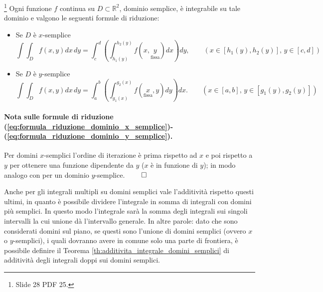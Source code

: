 \begin{theorem}\label{th:formula_riduzione_domini_semplici}\footnote{Slide 28 PDF 25.}
	Ogni funzione $f$ continua su $D\subset\mathbb{R}^2$, dominio semplice, è integrabile su tale dominio e valgono le seguenti formule di riduzione:
	\begin{itemize}
		\item Se $D$ è $x$-semplice
		\begin{equation}\label{eq:formula_riduzione_dominio_x_semplice}
			\int\int_D f(x,y) dx \, dy = \int_c^d\left(\int_{h_1(y)}^{h_2(y)}f(x,\underset{\text{fissa}}{y}) dx\right)dy,\qquad (x\in[h_1(y), h_2(y)],\, y\in [c,d])
		\end{equation}
		\item Se $D$ è $y$-semplice
		\begin{equation}\label{eq:formula_riduzione_dominio_y_semplice}
			\int\int_D f(x,y)dx\, dy = \int_a^b\left(\int_{g_1(x)}^{g_2(x)}f(\underset{\text{fissa}}{x},y)dy\right)dx. \qquad (x\in[a,b],\, y\in [g_1(y), g_2(y)])
		\end{equation}
	\end{itemize}
\end{theorem}

\paragraph{Nota sulle formule di riduzione (\ref{eq:formula_riduzione_dominio_x_semplice})-(\ref{eq:formula_riduzione_dominio_y_semplice}).} Per domini $x$-semplici l'ordine di iterazione è prima rispetto ad $x$ e poi rispetto a $y$ per ottenere una funzione dipendente da $y$ ($x$ è in funzione di $y$); in modo analogo con per un dominio $y$-semplice. $\qed$

Anche per gli integrali multipli su domini semplici vale l'additività rispetto questi ultimi, in quanto è possibile dividere l'integrale in somma di integrali con domini più semplici. In questo modo l'integrale sarà la somma degli integrali sui singoli intervalli la cui unione dà l'intervallo generale. In altre parole: dato che sono considerati domini sul piano, se questi sono l'unione di domini semplici (ovvero $x$ o $y$-semplici), i quali dovranno avere in comune solo una parte di frontiera, è possibile definire il Teorema \ref{th:additivita_integrale_domini_semplici} di additività degli integrali doppi sui domini semplici.

